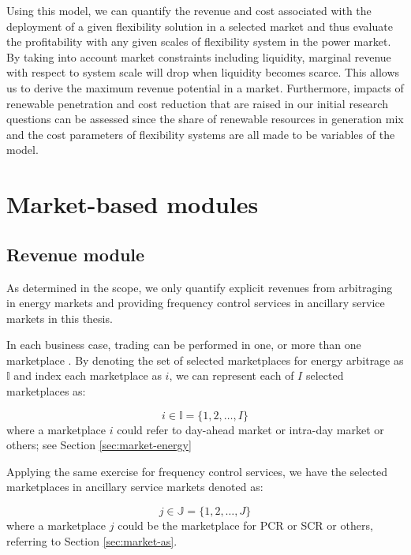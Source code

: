 Using this model, we can quantify the revenue and cost associated with the deployment of a given flexibility solution in a selected market and thus evaluate the profitability with any given scales of flexibility system in the power market. By taking into account market constraints including liquidity, marginal revenue with respect to system scale will drop when liquidity becomes scarce. This allows us to derive the maximum revenue potential in a market. Furthermore, impacts of renewable penetration and cost reduction that are raised in our initial research questions can be assessed since the share of renewable resources in generation mix and the cost parameters of flexibility systems are all made to be variables of the model.

\section{Market-based modules}

\subsection{Revenue module}
\label{sec:revenue}
As determined in the scope, we only quantify explicit revenues from arbitraging in energy markets and providing frequency control services in ancillary service markets in this thesis.

In each business case, trading can be performed in one, or more than one marketplace%
. By denoting the set of selected marketplaces for energy arbitrage as $\mathbb{I}$ and index each marketplace as $i$, we can represent each of $I$ selected marketplaces as:

\begin{equation}
\label{eq:set-I}
	i \in \mathbb{I} = \{1,2,\dots,I\}
\end{equation}
where a marketplace $i$ could refer to day-ahead market or intra-day market or others; see Section \ref{sec:market-energy}

Applying the same exercise for frequency control services, we have the selected marketplaces in ancillary service markets denoted as:

\begin{equation}
\label{eq:set-J}
j \in \mathbb{J} = \{1,2,\dots,J\}
\end{equation}
where a marketplace $j$ could be the marketplace for PCR or SCR or others, referring to Section \ref{sec:market-as}.

